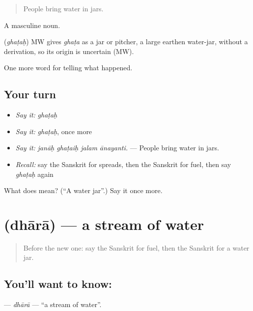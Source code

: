 \begin{quote}
People bring water in jars.
\end{quote}

A masculine noun.

\begin{cousinweb}
\textbf{} (\emph{ghaṭaḥ}) MW gives \emph{ghaṭa} as a jar or pitcher, a large earthen water-jar, without a derivation, so its origin is uncertain (MW).
\end{cousinweb}

\begin{grammarlens}[title={What you've built}]
One more word for telling what happened.
\end{grammarlens}

\subsection*{Your turn}
\begin{itemize}
\raggedright
  \item \emph{Say it:} \emph{ghaṭaḥ}
  \item \emph{Say it:} \emph{ghaṭaḥ}, once more
  \item \emph{Say it:} \emph{janāḥ ghaṭaiḥ jalam ānayanti.} — People bring water in jars.
  \item \emph{Recall:} say the Sanskrit for spreads, then the Sanskrit for fuel, then say \emph{ghaṭaḥ} again
\end{itemize}

\begin{tcolorbox}[breakable,colback=teal!4,colframe=teal!35!black,title={Before you move on}]
What does  mean? (\textquotedblleft{}A water jar\textquotedblright{}.) Say it once more.
\end{tcolorbox}
\section[\texorpdfstring{\sk{धारा} (dhārā)}{धारा (dhārā)}]{ (dhārā) — a stream of water}

\label{lesson:SA-C297-dhara}



\begin{quote}
Before the new one: say the Sanskrit for fuel, then the Sanskrit for a water jar.
\end{quote}

\subsection*{You'll want to know: }
\textbf{} — \emph{dhārā} — \textquotedblleft{}a stream of water\textquotedblright{}.

